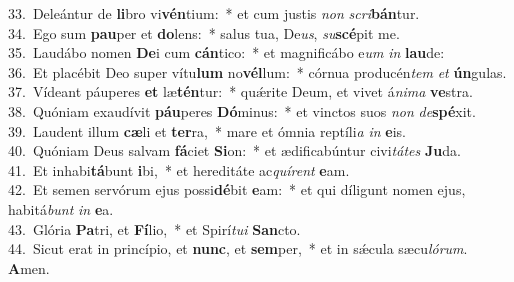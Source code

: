 {33.~}Deleántur de \textbf{li}bro vi\textbf{vén}tium:~* et cum justis \textit{non} \textit{scri}\textbf{bán}tur.\\
{34.~}Ego sum \textbf{pau}per et \textbf{do}lens:~* salus tua, De\textit{us}, \textit{su}\textbf{scé}pit me.\\
{35.~}Laudábo nomen \textbf{De}i cum \textbf{cán}tico:~* et magnificábo e\textit{um} \textit{in} \textbf{lau}de:\\
{36.~}Et placébit Deo super vítu\textbf{lum} no\textbf{vél}lum:~* córnua producén\textit{tem} \textit{et} \textbf{ún}gulas.\\
{37.~}Vídeant páuperes \textbf{et} læ\textbf{tén}tur:~* quǽrite Deum, et vivet á\textit{ni}\textit{ma} \textbf{ve}stra.\\
{38.~}Quóniam exaudívit \textbf{páu}peres \textbf{Dó}minus:~* et vinctos suos \textit{non} \textit{de}\textbf{spé}xit.\\
{39.~}Laudent illum \textbf{cæ}li et \textbf{ter}ra,~* mare et ómnia reptíli\textit{a} \textit{in} \textbf{e}is.\\
{40.~}Quóniam Deus salvam \textbf{fá}ciet \textbf{Si}on:~* et ædificabúntur civi\textit{tá}\textit{tes} \textbf{Ju}da.\\
{41.~}Et inhabi\textbf{tá}bunt \textbf{i}bi,~* et hereditáte ac\textit{quí}\textit{rent} \textbf{e}am.\\
{42.~}Et semen servórum ejus possi\textbf{dé}bit \textbf{e}am:~* et qui díligunt nomen ejus, habitá\textit{bunt} \textit{in} \textbf{e}a.\\
{43.~}Glória \textbf{Pa}tri, et \textbf{Fí}lio,~* et Spirí\textit{tu}\textit{i} \textbf{San}cto.\\
{44.~}Sicut erat in princípio, et \textbf{nunc}, et \textbf{sem}per,~* et in sǽcula sæcu\textit{ló}\textit{rum}. \textbf{A}men.\\
